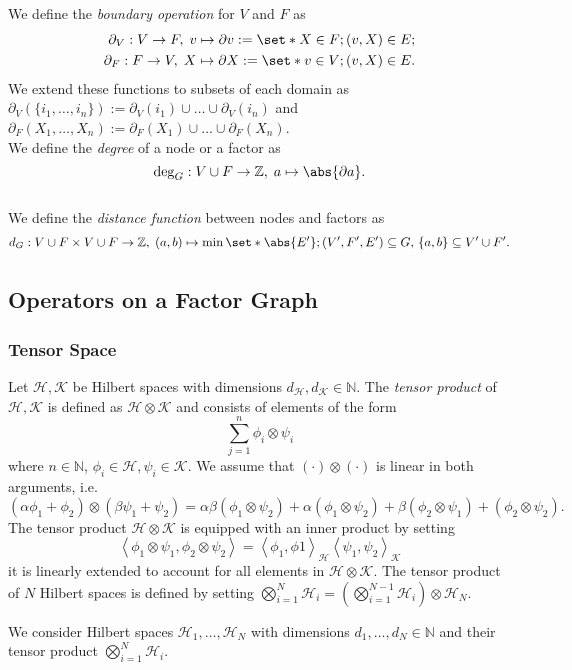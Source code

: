 \begin{defn}
    We define the \emph{boundary operation} for \(V\) and \(F\) as
    \begin{align*}
      \partial_V: V \to F,\; v \mapsto\partial v:=\set*{X \in F; (v,X) \in E }; \\
      \partial_F: F \to V,\; X \mapsto\partial X:=\set*{v \in V; (v,X) \in E}.
    \end{align*}
    We extend these functions to subsets of each domain as \(\partial_V(\{i_1,\dots,i_n\}):= \partial_V(i_1) \cup \dots \cup \partial_V(i_n)\) and \(\partial_F(X_1,\dots,X_n):= \partial_F(X_1) \cup \dots \cup \partial_F(X_n)\).
    \\ We define the \emph{degree} of a node or a factor as 
    \[ \operatorname{deg}_G: V \cup F \to \mathbb{Z}, \; a \mapsto \abs{\partial a}.\]
    \\ We define the \emph{distance function} between nodes and factors as 
    \[d_G: V \cup F \times V \cup F \to \mathbb{Z}, \; (a,b) \mapsto \min_{} \set*{ \abs{E'}; (V',F',E') \subseteq G,\, \{a,b\} \subseteq V' \cup F' }. \]
\end{defn}


\subsection{Operators on a Factor Graph}

\subsubsection{Tensor Space}

\begin{defn}
    Let \(\mathcal{H}, \mathcal{K}\) be Hilbert spaces with dimensions \(d_{\mathcal{H}} , d_{\mathcal{K}} \in \mathbb{N}\). The \emph{tensor product} of \(\mathcal{H},\mathcal{K}\) is defined as \(\mathcal{H} \otimes \mathcal{K}\) and consists of elements of the form 
    \[\sum_{j=1}^{n} \phi_i \otimes \psi_i \]
    where \(n \in \mathbb{N}\), \(\phi_i \in \mathcal{H}, \psi_i \in \mathcal{K}\). We assume that \((\cdot) \otimes (\cdot)\) is linear in both arguments, i.e.
    \[(\alpha \phi_1 + \phi_2) \otimes (\beta \psi_1 + \psi_2)= \alpha \beta(\phi_1 \otimes \psi_2) + \alpha(\phi_1 \otimes \psi_2) + \beta(\phi_2 \otimes \psi_1) + (\phi_2 \otimes \psi_2).\]
    The tensor product \(\mathcal{H} \otimes \mathcal{K}\) is equipped with an inner product by setting \[ \left\langle \phi_1 \otimes \psi_1 , \phi_2 \otimes \psi_2 \right\rangle = \left\langle \phi_1, \phi1 \right\rangle_{\mathcal{H}} \left\langle \psi_1 , \psi_2  \right\rangle_{\mathcal{K}}   \] it is linearly extended to account for all elements in \(\mathcal{H} \otimes \mathcal{K}\).
    The tensor product of \(N\) Hilbert spaces is defined by setting \(\bigotimes_{i=1}^{N} \mathcal{H}_i = \left(\bigotimes_{i=1}^{N-1}\mathcal{H}_i\right) \otimes \mathcal{H}_N \).
  \end{defn}
We consider Hilbert spaces \(\mathcal{H}_1, \dots, \mathcal{H}_N\) with dimensions \(d_1,\dots, d_N \in \mathbb{N}\) and their tensor product \(\bigotimes_{i=1}^{N} \mathcal{H}_i\).


